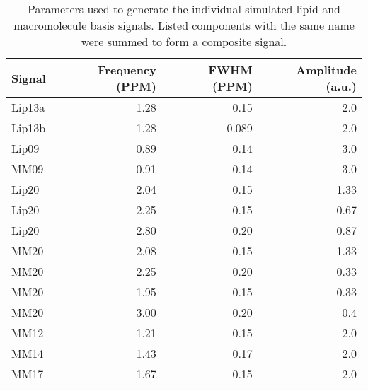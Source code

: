 \documentclass[num-refs]{wiley-article}
\begin{document}
\begin{table}[ht]
\begin{center}
\begin{tabular}{l r r r}
  \hline
  Signal & Frequency (PPM) & FWHM (PPM) & Amplitude (a.u.) \\
  \hline
  Lip13a & 1.28 & 0.15 & 2.0 \\
  Lip13b & 1.28 & 0.089 & 2.0 \\
  Lip09 & 0.89 & 0.14 & 3.0 \\
  MM09 & 0.91 & 0.14 & 3.0 \\
  Lip20 & 2.04 & 0.15 & 1.33 \\
  Lip20 & 2.25 & 0.15 & 0.67 \\
  Lip20 & 2.80 & 0.20 & 0.87 \\
  MM20 & 2.08 & 0.15 & 1.33 \\
  MM20 & 2.25 & 0.20 & 0.33 \\
  MM20 & 1.95 & 0.15 & 0.33 \\
  MM20 & 3.00 & 0.20 & 0.4 \\
  MM12 & 1.21 & 0.15 & 2.0 \\
  MM14 & 1.43 & 0.17 & 2.0 \\
  MM17 & 1.67 & 0.15 & 2.0 \\
  \hline
\end{tabular}
\end{center}
\caption{Parameters used to generate the individual simulated lipid and macromolecule basis signals. Listed components with the same name were summed to form a composite signal.}
\label{lip_mm_tab}
\end{table}
\end{document}
